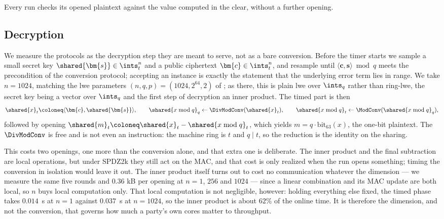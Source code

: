 Every run checks its opened plaintext against the value computed in the clear, without a further opening.

\subsection{Decryption}
\label{sec:benchmark-online}

We measure the protocols as the decryption step they are meant to serve, not as a bare conversion.
Before the timer starts we sample a small secret key $\shared{\bm{s}} \in \ints_t^n$ and a public ciphertext $\bm{c} \in \ints_t^n$, and resample until $\langle \bm{c}, \bm{s}\rangle \bmod q$ meets the precondition of the conversion protocol;
accepting an instance is exactly the statement that the underlying error term lies in range.
We take $n = 1024$, matching the \gls{lwe} parameters $(n, q, p) = (1024, 2^{64}, 2)$ of \cite{CCS:ZZLP25}; as there, this is plain \gls{lwe} over $\ints_q$ rather than ring-\gls{lwe}, the secret key being a vector over $\ints_q$ and the first step of decryption an inner product.
The timed part is then
\[
    \shared{x}_t \coloneq \langle \bm{c}, \shared{\bm{s}} \rangle,
    \qquad
    \shared{x \bmod q}_q \gets \DivModConv(\shared{x}_t),
    \qquad
    \shared{x \bmod q}_t \gets \ModConv(\shared{x \bmod q}_q),
\]
followed by opening $\shared{m}_t \coloneq \shared{x}_t - \shared{x \bmod q}_t$, which yields $m = q \cdot \mathrm{bit}_{63}(x)$, the one-bit plaintext.
The $\DivModConv$ is free and is not even an instruction: the machine ring is $t$ and $q \mid t$, so the reduction is the identity on the sharing.

This costs two openings, one more than the conversion alone, and that extra one is deliberate.
The inner product and the final subtraction are local operations, but under SPDZ2k they still act on the MAC, and that cost is only realized when the run opens something;
timing the conversion in isolation would leave it out.
The inner product itself turns out to cost no communication whatever the dimension --- we measure the same five rounds and $0.36$ kB per opening at $n = 1$, $256$ and $1024$ --- since a linear combination and its MAC update are both local, so $n$ buys local computation only.
That local computation is not negligible, however: holding everything else fixed, the timed phase takes $0.014$~s at $n = 1$ against $0.037$~s at $n = 1024$, so the inner product is about $62\%$ of the online time.
It is therefore the dimension, and not the conversion, that governs how much a party's own cores matter to throughput.

